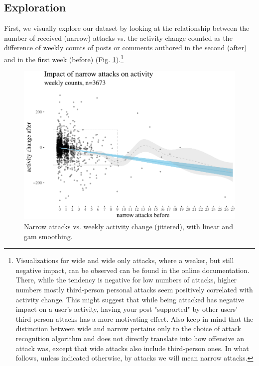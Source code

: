 \documentclass[a4paper,fleqn]{cas-dc}
\begin{document}
\subsection{Exploration}



First, we visually explore our dataset by looking at the relationship between the number of received (narrow) attacks vs. the activity change counted as the difference of weekly counts of posts or comments authored  in the second (\textsf{after}) and in the first  week (\textsf{before}) (Fig. \ref{fig:highPlots}).\footnote{Visualizations for \textsf{wide} and \textsf{wide only} attacks, where a weaker, but still negative impact, can be observed can be found in the online documentation.  There, while the tendency is negative for low numbers of attacks,  higher numbers mostly third-person personal attacks seem positively correlated with activity change. This might suggest that while being attacked has negative impact on a user's activity, having your post "supported" by other users' third-person attacks has a more motivating effect. Also keep in mind that  the distinction between wide and narrow pertains only to the choice of attack recognition algorithm and does not directly translate into how offensive an attack was, except that \textsf{wide} attacks also include third-person ones. In what follows, unless indicated otherwise, by attacks we will mean narrow attacks.} 


\begin{figure}
\begin{center}
\includegraphics[width=\textwidth]{images/hihgplot2-1} 
\end{center}
\caption{Narrow attacks vs. weekly activity change (jittered), with  linear and gam smoothing.}
\label{fig:highPlots}
\end{figure}
\end{document}

